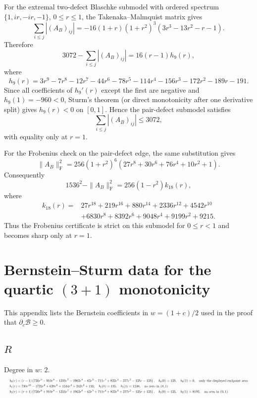 \documentclass[11pt]{article}
\numberwithin{equation}{section}
\begin{document}
For the extremal two-defect Blaschke submodel with ordered spectrum
\(\{1,ir,-ir,-1\}\), \(0\le r\le1\), the Takenaka--Malmquist matrix gives
\[
\sum_{i\le j}|(A_B)_{ij}|
= -16(1+r)(1+r^2)^3(3r^3-13r^2-r-1).
\]
Therefore
\[
3072-\sum_{i\le j}|(A_B)_{ij}|
=16(r-1)h_9(r),
\]
where
\[
 h_9(r)=3r^9-7r^8-12r^7-44r^6-78r^5-114r^4-156r^3-172r^2-189r-191.
\]
Since all coefficients of \(h_9'(r)\) except the first are negative and
\(h_9(1)=-960<0\), Sturm's theorem (or direct monotonicity after one derivative
split) gives \(h_9(r)<0\) on \([0,1]\).  Hence the pair-defect submodel satisfies
\[
\sum_{i\le j}|(A_B)_{ij}|\le3072,
\]
with equality only at \(r=1\).

For the Frobenius check on the pair-defect edge, the same substitution gives
\[
  \|A_B\|_{\mathrm F}^2
  =256(1+r^2)^6(27r^8+30r^6+76r^4+10r^2+1).
\]
Consequently
\[
  1536^2-\|A_B\|_{\mathrm F}^2=256(1-r^2)k_{18}(r),
\]
where
\[
\begin{aligned}
k_{18}(r)={}&27r^{18}+219r^{16}+880r^{14}+2336r^{12}+4542r^{10}\\
&+6830r^8+8392r^6+9048r^4+9199r^2+9215 .
\end{aligned}
\]
Thus the Frobenius certificate is strict on this submodel for \(0\le r<1\)
and becomes sharp only at \(r=1\).

\section{Bernstein--Sturm data for the quartic $(3+1)$ monotonicity}\label{app:bernstein-3plus1}
This appendix lists the Bernstein coefficients in $w=(1+c)/2$ used in the proof that $\partial_c\mathcal B\ge0$.
\begingroup
\scriptsize
\subsection*{$R$}
Degree in $w$: $2$.
\[
\resizebox{\textwidth}{!}{$\begin{aligned}
b_{0}(r)&=\left(r - 1\right) \left(730 r^{9} - 910 r^{8} - 1355 r^{7} - 1963 r^{6} - 63 r^{5} - 711 r^{4} + 823 r^{3} - 377 r^{2} - 135 r - 135\right),\quad b_{0}(0)=135,\quad b_{0}(1)=0,\quad \text{only the displayed endpoint zero}\\
b_{1}(r)&=730 r^{10} - 1725 r^{8} + 620 r^{6} + 1534 r^{4} + 242 r^{2} + 135,\quad b_{1}(0)=135,\quad b_{1}(1)=1536,\quad \text{no zero in }(0,1)\\
b_{2}(r)&=\left(r + 1\right) \left(730 r^{9} + 910 r^{8} - 1355 r^{7} + 1963 r^{6} - 63 r^{5} + 711 r^{4} + 823 r^{3} + 377 r^{2} - 135 r + 135\right),\quad b_{2}(0)=135,\quad b_{2}(1)=8192,\quad \text{no zero in }(0,1)\\
\end{aligned}$}
\]
\end{document}
